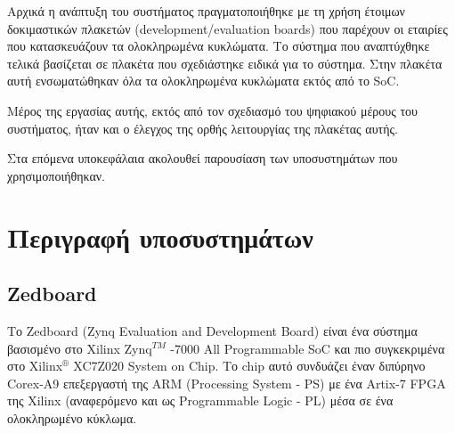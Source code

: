 \documentclass[12pt,a4paper]{book}
\begin{document}
Αρχικά η ανάπτυξη του συστήματος πραγματοποιήθηκε με τη χρήση έτοιμων δοκιμαστικών πλακετών (development/evaluation boards) που παρέχουν οι εταιρίες που κατασκευάζουν τα ολοκληρωμένα κυκλώματα. Το σύστημα που αναπτύχθηκε τελικά βασίζεται σε πλακέτα που σχεδιάστηκε ειδικά για το σύστημα. Στην πλακέτα αυτή ενσωματώθηκαν όλα τα ολοκληρωμένα κυκλώματα εκτός από το SoC. 

Μέρος της εργασίας αυτής, εκτός από τον σχεδιασμό του ψηφιακού μέρους του συστήματος, ήταν και ο έλεγχος της ορθής λειτουργίας της πλακέτας αυτής.

Στα επόμενα υποκεφάλαια ακολουθεί παρουσίαση των υποσυστημάτων που χρησιμοποιήθηκαν.
\section{Περιγραφή υποσυστημάτων}

\subsection{Zedboard}
Το Zedboard (Zynq Evaluation and Development Board) είναι ένα σύστημα βασισμένο στο Xilinx Zynq$ ^{TM} $ -7000 All Programmable SoC και πιο συγκεκριμένα στο Xilinx$ ^{®} $ XC7Z020 System on Chip. Το chip αυτό συνδυάζει έναν διπύρηνο Corex-A9 επεξεργαστή της ARM (Processing System - PS) με ένα Artix-7 FPGA της Xilinx (αναφερόμενο και ως Programmable Logic - PL) μέσα σε ένα ολοκληρωμένο κύκλωμα. 
\end{document}
